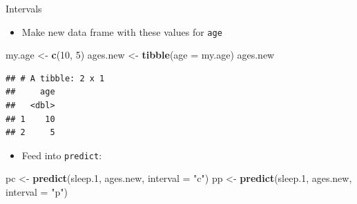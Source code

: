 \documentclass[ignorenonframetext,]{beamer}
\newenvironment{Shaded}{\begin{snugshade}}{\end{snugshade}}
\newcommand{\DataTypeTok}[1]{\textcolor[rgb]{0.13,0.29,0.53}{#1}}
\newcommand{\DecValTok}[1]{\textcolor[rgb]{0.00,0.00,0.81}{#1}}
\newcommand{\FloatTok}[1]{\textcolor[rgb]{0.00,0.00,0.81}{#1}}
\newcommand{\KeywordTok}[1]{\textcolor[rgb]{0.13,0.29,0.53}{\textbf{#1}}}
\newcommand{\NormalTok}[1]{#1}
\newcommand{\StringTok}[1]{\textcolor[rgb]{0.31,0.60,0.02}{#1}}
\providecommand{\tightlist}{%
  \setlength{\itemsep}{0pt}\setlength{\parskip}{0pt}}
\begin{document}
\begin{frame}[fragile]{Intervals}
\protect\hypertarget{intervals}{}

\begin{itemize}
\tightlist
\item
  Make new data frame with these values for \texttt{age}
\end{itemize}

\begin{Shaded}
\begin{Highlighting}[]
\NormalTok{my.age <-}\StringTok{ }\KeywordTok{c}\NormalTok{(}\DecValTok{10}\NormalTok{, }\DecValTok{5}\NormalTok{)}
\NormalTok{ages.new <-}\StringTok{ }\KeywordTok{tibble}\NormalTok{(}\DataTypeTok{age =}\NormalTok{ my.age)}
\NormalTok{ages.new}
\end{Highlighting}
\end{Shaded}

\begin{verbatim}
## # A tibble: 2 x 1
##     age
##   <dbl>
## 1    10
## 2     5
\end{verbatim}

\begin{itemize}
\tightlist
\item
  Feed into \texttt{predict}:
\end{itemize}

\begin{Shaded}
\begin{Highlighting}[]
\NormalTok{pc <-}\StringTok{ }\KeywordTok{predict}\NormalTok{(sleep}\FloatTok{.1}\NormalTok{, ages.new, }\DataTypeTok{interval =} \StringTok{"c"}\NormalTok{)}
\NormalTok{pp <-}\StringTok{ }\KeywordTok{predict}\NormalTok{(sleep}\FloatTok{.1}\NormalTok{, ages.new, }\DataTypeTok{interval =} \StringTok{"p"}\NormalTok{)}
\end{Highlighting}
\end{Shaded}

\end{frame}
\end{document}
